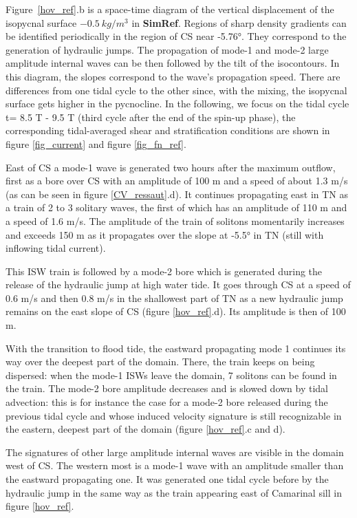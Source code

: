\documentclass[a4paper,12pt]{article}
\begin{document}
\indent Figure\ \ref{hov_ref}.b is a space-time diagram of the vertical displacement of the isopycnal surface $-0.5\  kg/m^3$ in \textbf{SimRef}. Regions of sharp density gradients can be identified periodically in the region of CS near -5.76°. They correspond to the generation of hydraulic jumps. The propagation of mode-1 and mode-2 large amplitude internal waves can be then followed by the tilt of the isocontours. In this diagram, the slopes correspond to the wave's propagation speed. There are differences from one tidal cycle to the other since, with the mixing, the isopycnal surface gets higher in the pycnocline. In the following, we focus on the tidal cycle t= 8.5 T - 9.5 T (third cycle after the end of the spin-up phase), the corresponding tidal-averaged shear and stratification conditions are shown in figure \ref{fig_current} and figure \ref{fig_fn_ref}.

East of CS a mode-1 wave is generated two hours after the maximum outflow, first as a bore over CS with an amplitude of 100 m and a speed of about 1.3 m/s (as can be seen in figure \ref{CV_ressaut}.d). It continues propagating east in TN as a train of 2 to 3 solitary waves, the first of which has an amplitude of 110 m and a speed of 1.6 m/s. The amplitude of the train of solitons momentarily increases and exceeds 150 m as it propagates over the slope at -5.5° in TN (still with inflowing tidal current).

This ISW train is followed by a mode-2 bore which is generated during the release of the hydraulic jump at high water tide. It goes through CS at a speed of 0.6 m/s and then 0.8 m/s in the shallowest part of TN as a new hydraulic jump remains on the east slope of CS (figure \ref{hov_ref}.d). Its amplitude is then of 100 m. 

With the transition to flood tide, the eastward propagating mode 1 continues its way over the deepest part of the domain. There, the train keeps on being dispersed: when the mode-1 ISWs leave the domain, 7 solitons can be found in the train. The mode-2 bore amplitude decreases and is slowed down by tidal advection: this is for instance the case for a mode-2 bore released during the previous tidal cycle and whose induced velocity signature is still recognizable in the eastern, deepest part of the domain (figure \ref{hov_ref}.c and d).

The signatures of other large amplitude internal waves are visible in the domain west of CS. The western most is a mode-1 wave with an amplitude smaller than the eastward propagating one. It was generated one tidal cycle before by the hydraulic jump in the same way as the train appearing east of Camarinal sill in figure \ref{hov_ref}.
\end{document}
